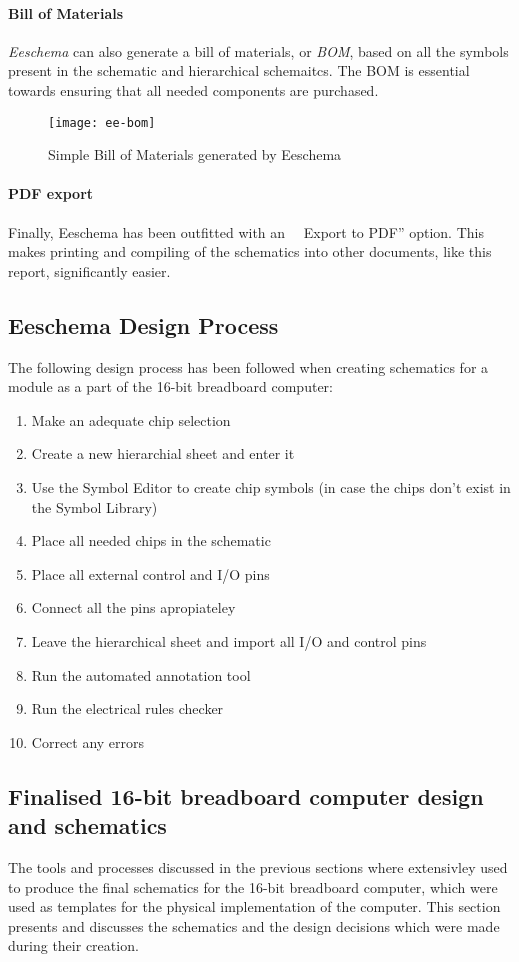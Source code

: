 \paragraph{Bill of Materials}
\emph{Eeschema} can also generate a bill of materials, or \emph{BOM}, based on all the symbols present in the schematic and
hierarchical schemaitcs. The BOM is essential towards ensuring that all needed components are purchased.

\begin{figure}[h]
  \centering
  \texttt{[image: ee-bom]}
  \caption{Simple Bill of Materials generated by Eeschema}
  \label{ee-bom}
\end{figure}

\paragraph{PDF export}
Finally, Eeschema has been outfitted with an ~~Export to PDF'' option. This makes printing and compiling of the
schematics into other documents, like this report, significantly easier.

\subsection{Eeschema Design Process}
The following design process has been followed when creating schematics for a module as a part of the 16-bit breadboard
computer:
\begin{enumerate}
  \item Make an adequate chip selection
  \item Create a new hierarchial sheet and enter it
  \item Use the Symbol Editor to create chip symbols (in case the chips don't exist in the Symbol Library)
  \item Place all needed chips in the schematic
  \item Place all external control and I/O pins
  \item Connect all the pins apropiateley
  \item Leave the hierarchical sheet and import all I/O and control pins
  \item Run the automated annotation tool
  \item Run the electrical rules checker
  \item Correct any errors
\end{enumerate}

\subsection{Finalised 16-bit breadboard computer design and schematics}
The tools and processes discussed in the previous sections where extensivley used to produce the final schematics
for the 16-bit breadboard computer, which were used as templates for the physical implementation of the computer.
This section presents and discusses the schematics and the design decisions which were made during their creation.

